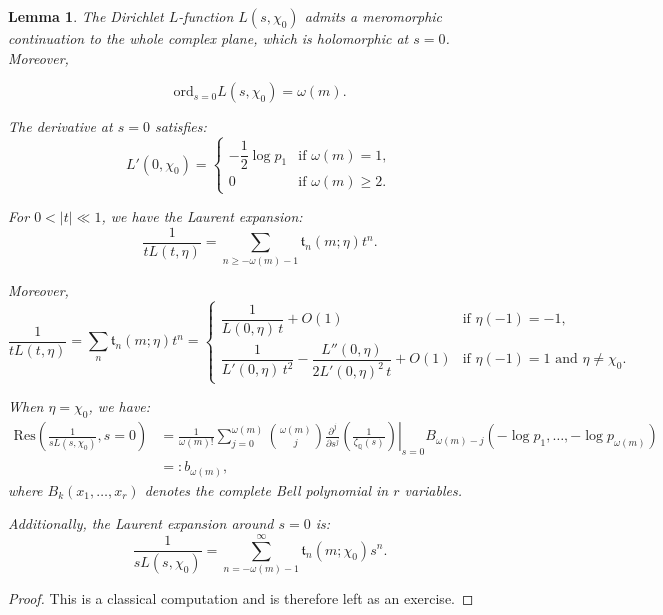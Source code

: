 \documentclass[12pt]{amsart}
\newtheorem{lemma}[theorem]{Lemma}
\begin{document}
\begin{lemma}\label{formulas1}
The Dirichlet $L$-function $L(s, \chi_0)$ admits a meromorphic continuation to the whole complex plane, which is holomorphic at $s=0$. Moreover,


\[
\mathrm{ord}_{s=0} L(s, \chi_0) = \omega(m).
\]


The derivative at $s=0$ satisfies:
\[
L'(0, \chi_0) =
\begin{cases}
-\dfrac{1}{2} \log p_1 & \text{if } \omega(m) = 1, \\
0 & \text{if } \omega(m) \geq 2.
\end{cases}
\]


For $0 < |t| \ll 1$, we have the Laurent expansion:
\[
\frac{1}{t L(t, \eta)} = \sum_{n \geq -\omega(m) - 1} \mathfrak{t}_n(m; \eta) t^n.
\]


Moreover,
\begin{equation}\label{eq:laurent-L}
\frac{1}{t L(t, \eta)} = \sum_{n} \mathfrak{t}_n(m; \eta) t^n =
\begin{cases}
\dfrac{1}{L(0, \eta)\, t} + O(1) & \text{if } \eta(-1) = -1, \\[2ex]
\dfrac{1}{L'(0, \eta)\, t^2} - \dfrac{L''(0, \eta)}{2 L'(0, \eta)^2\, t} + O(1) & \text{if } \eta(-1) = 1 \text{ and } \eta \neq \chi_0.
\end{cases}
\end{equation}


When $\eta = \chi_0$, we have:
\begin{equation}\label{bl}
\begin{split}
\mathrm{Res}\left( \frac{1}{s L(s, \chi_0)}, s=0 \right)
&= \frac{1}{\omega(m)!} \sum_{j=0}^{\omega(m)} \binom{\omega(m)}{j} 
\left. \frac{\partial^j}{\partial s^j} \left( \frac{1}{\zeta_{\mathbb{Q}}(s)} \right) \right|_{s=0}
B_{\omega(m)-j}(-\log p_1, \ldots, -\log p_{\omega(m)}) \\
&=: b_{\omega(m)},
\end{split}
\end{equation}
where $B_k(x_1,\dots,x_r)$ denotes the complete Bell polynomial in $r$ variables.


Additionally, the Laurent expansion around $s=0$ is:
\[
\frac{1}{s L(s, \chi_0)} = \sum_{n = -\omega(m) - 1}^{\infty} \mathfrak{t}_n(m; \chi_0) s^n.
\]
\end{lemma}




 \begin{proof}


This is a classical computation and is therefore left as an exercise.
  \end{proof}
\end{document}
